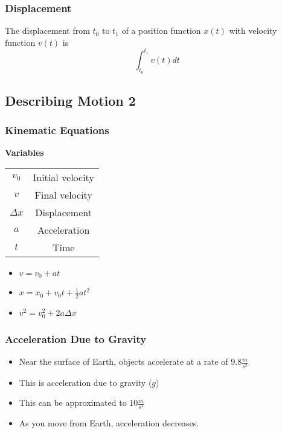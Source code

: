 \documentclass[12pt]{article}
\theoremstyle{break}
\numberwithin{theorem}{subsection}
\numberwithin{lemma}{subsection}
\numberwithin{corollary}{subsection}
\numberwithin{equation}{subsection}
\begin{document}
\subsubsection{Displacement}
The displacement from $t_0$ to $t_1$ of a position function $x(t)$ with velocity function $v(t)$ is
\begin{equation*} 
\int_{t_0}^{t_1} v(t)dt
\end{equation*} 

\newpage
\subsection{Describing Motion 2}

\subsubsection{Kinematic Equations}
\begin{center}
\textbf{Variables}\\
\begin{tabular}{|c|c|}
\hline 
$v_0$ & Initial velocity \\
$v$ & Final velocity \\
$\Delta x$ & Displacement \\
$a$ & Acceleration \\
$t$ & Time \\
\hline
\end{tabular}
\end{center}
\begin{itemize}
	\item $v = v_0 + at$
	\item $x = x_0 + v_0 t + \frac12 at^2$
	\item $v^2 = v_0^2 + 2a\Delta x$
\end{itemize}

\subsubsection{Acceleration Due to Gravity}
\begin{itemize}
	\item Near the surface of Earth, objects accelerate at a rate of $9.8 \frac m{s^2}$
	\item This is acceleration due to gravity ($g$)
	\item This can be approximated to $10 \frac m{s^2}$
	\item As you move from Earth, acceleration decreases.
\end{itemize}
\end{document}
